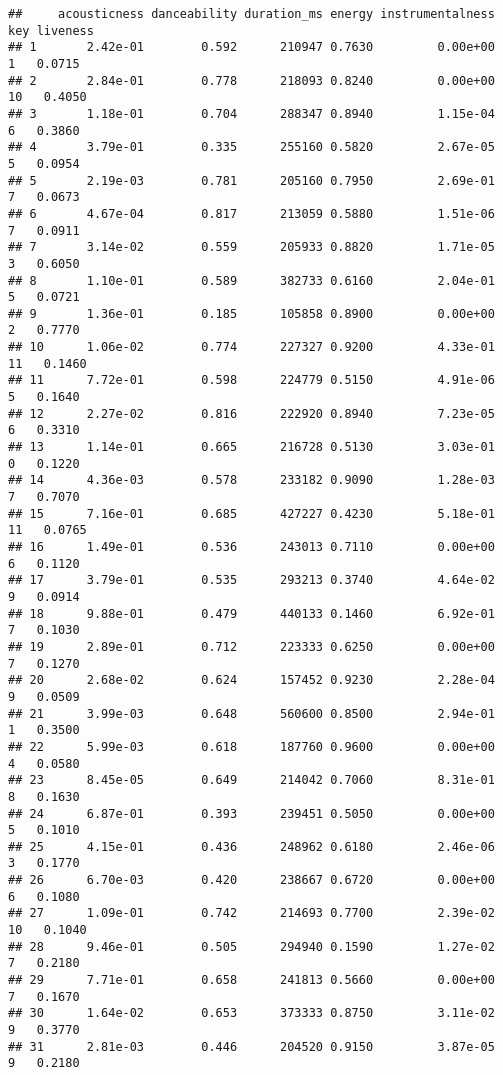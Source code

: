 \documentclass[
]{article}
\begin{document}
\begin{verbatim}
##     acousticness danceability duration_ms energy instrumentalness key liveness
## 1       2.42e-01        0.592      210947 0.7630         0.00e+00   1   0.0715
## 2       2.84e-01        0.778      218093 0.8240         0.00e+00  10   0.4050
## 3       1.18e-01        0.704      288347 0.8940         1.15e-04   6   0.3860
## 4       3.79e-01        0.335      255160 0.5820         2.67e-05   5   0.0954
## 5       2.19e-03        0.781      205160 0.7950         2.69e-01   7   0.0673
## 6       4.67e-04        0.817      213059 0.5880         1.51e-06   7   0.0911
## 7       3.14e-02        0.559      205933 0.8820         1.71e-05   3   0.6050
## 8       1.10e-01        0.589      382733 0.6160         2.04e-01   5   0.0721
## 9       1.36e-01        0.185      105858 0.8900         0.00e+00   2   0.7770
## 10      1.06e-02        0.774      227327 0.9200         4.33e-01  11   0.1460
## 11      7.72e-01        0.598      224779 0.5150         4.91e-06   5   0.1640
## 12      2.27e-02        0.816      222920 0.8940         7.23e-05   6   0.3310
## 13      1.14e-01        0.665      216728 0.5130         3.03e-01   0   0.1220
## 14      4.36e-03        0.578      233182 0.9090         1.28e-03   7   0.7070
## 15      7.16e-01        0.685      427227 0.4230         5.18e-01  11   0.0765
## 16      1.49e-01        0.536      243013 0.7110         0.00e+00   6   0.1120
## 17      3.79e-01        0.535      293213 0.3740         4.64e-02   9   0.0914
## 18      9.88e-01        0.479      440133 0.1460         6.92e-01   7   0.1030
## 19      2.89e-01        0.712      223333 0.6250         0.00e+00   7   0.1270
## 20      2.68e-02        0.624      157452 0.9230         2.28e-04   9   0.0509
## 21      3.99e-03        0.648      560600 0.8500         2.94e-01   1   0.3500
## 22      5.99e-03        0.618      187760 0.9600         0.00e+00   4   0.0580
## 23      8.45e-05        0.649      214042 0.7060         8.31e-01   8   0.1630
## 24      6.87e-01        0.393      239451 0.5050         0.00e+00   5   0.1010
## 25      4.15e-01        0.436      248962 0.6180         2.46e-06   3   0.1770
## 26      6.70e-03        0.420      238667 0.6720         0.00e+00   6   0.1080
## 27      1.09e-01        0.742      214693 0.7700         2.39e-02  10   0.1040
## 28      9.46e-01        0.505      294940 0.1590         1.27e-02   7   0.2180
## 29      7.71e-01        0.658      241813 0.5660         0.00e+00   7   0.1670
## 30      1.64e-02        0.653      373333 0.8750         3.11e-02   9   0.3770
## 31      2.81e-03        0.446      204520 0.9150         3.87e-05   9   0.2180

\end{verbatim}
\end{document}
